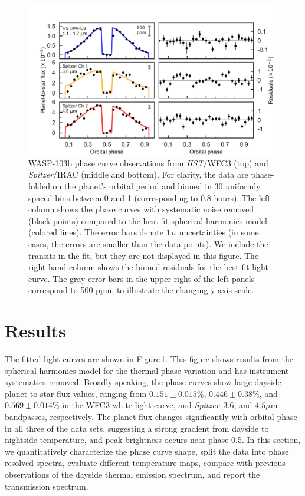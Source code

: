 \documentclass[twocolumn, trackchanges]{aastex61}
\newcommand{\project}[1]{\textsl{#1}}
\newcommand{\HST}{\project{HST}}
\newcommand{\Spitzer}{\project{Spitzer}}
\begin{document}
\begin{figure}
\includegraphics[width = 1.0\textwidth]{fig5.pdf}
\caption{WASP-103b phase curve observations from \HST/WFC3 (top) and
\Spitzer/IRAC (middle and bottom). For clarity, the data are phase-folded on the
planet's orbital period and binned in 30 uniformly spaced bins between 0 and 1
(corresponding to 0.8 hours). The left column shows the phase curves with systematic noise removed (black points) compared to the best fit spherical harmonics model (colored lines). The error bars denote $1\,\sigma$ uncertainties (in some cases, the errors are smaller than the data points).  We include the transits in the fit, but they are not displayed in this figure. The right-hand column shows the binned residuals for the best-fit light curve. The gray error bars in the upper right of the left panels correspond to 500 ppm, to illustrate the changing y-axis scale.}
\label{fig:phasecurves}
\end{figure}

\section{Results}
\label{sec:results}
The fitted light curves are shown in Figure\,\ref{fig:phasecurves}. This figure shows results from the spherical harmonics model for the thermal phase variation and has instrument systematics removed.  Broadly speaking, the phase curves show large dayside planet-to-star flux values, ranging from $0.151\pm0.015\%$, $0.446\pm0.38\%$, and $0.569\pm0.014\%$ in the WFC3 white light curve, and \Spitzer\ $3.6$, and $4.5\mu$m bandpasses, respectively.  The planet flux changes significantly with orbital phase in all three of the data sets, suggesting a strong gradient from dayside to nightside temperature, and peak brightness occurs near phase 0.5. In this section, we quantitatively characterize the phase curve shape, split the data into phase resolved spectra, evaluate different temperature maps, compare with previous observations of the dayside thermal emission spectrum, and report the transmission spectrum.
\end{document}
